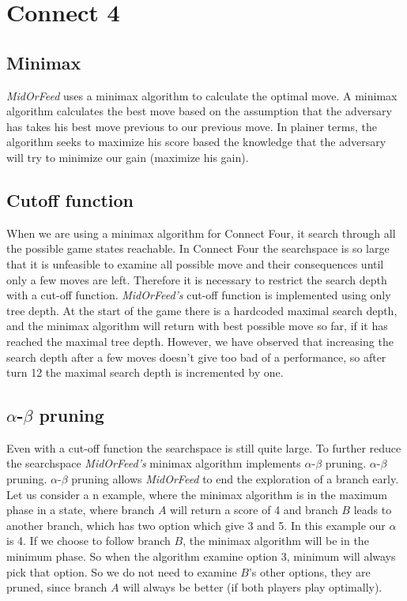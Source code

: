 \section{Connect 4}

\subsection{Minimax}
\textit{MidOrFeed} uses a minimax algorithm to calculate the optimal move. A minimax algorithm calculates the best move based on the assumption that the adversary has takes his best move previous to our previous move. In plainer terms, the algorithm seeks to maximize his score based the knowledge that the adversary will try to minimize our gain (maximize his gain).

\subsection{Cutoff function}
When we are using a minimax algorithm for Connect Four, it search through all the possible game states reachable. In Connect Four the searchspace is so large that it is unfeasible to examine all possible move and their consequences until only a few moves are left. Therefore it is necessary to restrict the search depth with a cut-off function. \textit{MidOrFeed's} cut-off function is implemented using only tree depth. At the start of the game there is a hardcoded maximal search depth, and the minimax algorithm will return with best possible move so far, if it has reached the maximal tree depth. However, we have observed that increasing the search depth after a few moves doesn't give too bad of a performance, so after turn 12 the maximal search depth is incremented by one.

\subsection{$\alpha$-$\beta$ pruning}
Even with a cut-off function the searchspace is still quite large. To further reduce the searchspace \textit{MidOrFeed's} minimax algorithm implements $\alpha$-$\beta$ pruning. $\alpha$-$\beta$ pruning. $\alpha$-$\beta$ pruning allows \textit{MidOrFeed} to end the exploration of a branch early. Let us consider a n example, where the minimax algorithm is in the maximum phase in a state, where branch $A$ will return a score of 4 and branch $B$ leads to another branch, which has two option which give 3 and 5. In this example our $\alpha$ is 4. If we choose to follow branch $B$, the minimax algorithm will be in the minimum phase. So when the algorithm examine option 3, minimum will always pick that option. So we do not need to examine $B$'s other options, they are pruned, since branch $A$ will always be better (if both players play optimally).

